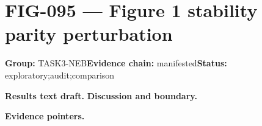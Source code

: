 \clearpage
\section{FIG-095 --- Figure 1 stability parity perturbation}
\label{figpage:fig-095}
\textbf{Group:} TASK3-NEB\quad \textbf{Evidence chain:} manifested\quad \textbf{Status:} exploratory;audit;comparison

\textbf{Results text draft.} 
\textbf{Discussion and boundary.} 


\textbf{Evidence pointers.}



\vfill
